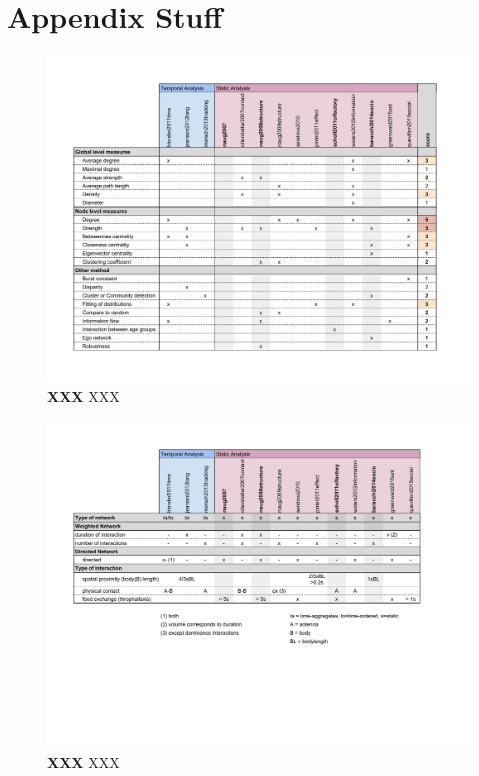 \chapter{Appendix Stuff}
\label{ch:appendix}







\begin{figure}[htb]
	\centering
	\includegraphics[width=1.0\textwidth]{Figures/study-measures}
	\caption[XXX]{\textbf{XXX} XXX}
	\label{fig:study-measures}
\end{figure}

\begin{figure}[htb]
	\centering
	\includegraphics[width=1.0\textwidth]{Figures/study-nwtype}
	\caption[XXX]{\textbf{XXX} XXX}
	\label{fig:study-nwtype}
\end{figure}

